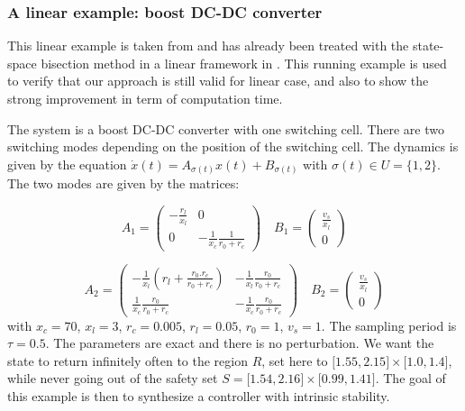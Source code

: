 \subsubsection{A linear example: boost DC-DC converter}

This linear example is taken from \cite{beccuti2005optimal} and has
already been treated with the state-space bisection method in a linear
framework in \cite{fribourg2014finite}. This running example is used to verify that our
approach is still valid for linear case, and also to show the strong improvement in term of computation time.

The system is a boost DC-DC converter with one switching cell.  There
are two switching modes depending on the position of the switching
cell. The dynamics is given by the equation $\dot x (t) =
A_{\sigma(t)} x(t) + B_{\sigma(t)}$ with $\sigma(t) \in U = \{ 1,2
\}$. The two modes are given by the matrices:

\begin{displaymath}
  A_1 = \left( \begin{matrix}
      - \frac{r_l}{x_l} & 0 \\ 0 & - \frac{1}{x_c} \frac{1}{r_0 + r_c}
    \end{matrix} \right)  \quad B_1 = \left( \begin{matrix}
      \frac{v_s}{x_l} \\ 0 \end{matrix} \right)
\end{displaymath}

\begin{displaymath}
  A_2 = \left( \begin{matrix} - \frac{1}{x_l} (r_l +
      \frac{r_0.r_c}{r_0 + r_c}) & - \frac{1}{x_l} \frac{r_0}{r_0 + r_c}
      \\ \frac{1}{x_c}\frac{r_0}{r_0 + r_c} & - \frac{1}{x_c}
      \frac{r_0}{r_0 + r_c}
    \end{matrix} \right)  \quad B_2 = \left( \begin{matrix}
      \frac{v_s}{x_l} \\ 0 \end{matrix} \right)
\end{displaymath}
with $x_c = 70$, $x_l = 3$, $r_c = 0.005$, $r_l = 0.05$, $r_0 = 1$,
$v_s = 1$.  The sampling period is $\tau = 0.5$.  The parameters are
exact and there is no perturbation.  We want the state to return
infinitely often to the region $R$, set here to $\lbrack 1.55 , 2.15
\rbrack \times \lbrack 1.0 , 1.4 \rbrack$, while never going out of
the safety set $S = \lbrack 1.54 , 2.16 \rbrack \times \lbrack 0.99 ,
1.41 \rbrack$.  The goal of this example is then to synthesize a
controller with intrinsic stability.

